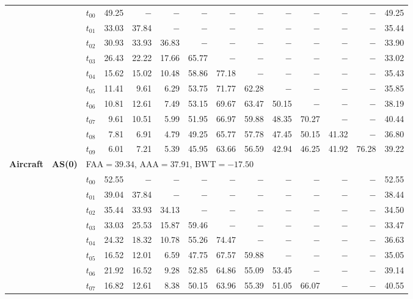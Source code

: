 \begin{table}[ht]
\begin{tabular}{@{}l l l *{11}{r}@{}}
 & & $t_{00}$ & 49.25 & $-$ & $-$ & $-$ & $-$ & $-$ & $-$ & $-$ & $-$ & $-$ & 49.25 \\
 & & $t_{01}$ & 33.03 & 37.84 & $-$ & $-$ & $-$ & $-$ & $-$ & $-$ & $-$ & $-$ & 35.44 \\
 & & $t_{02}$ & 30.93 & 33.93 & 36.83 & $-$ & $-$ & $-$ & $-$ & $-$ & $-$ & $-$ & 33.90 \\
 & & $t_{03}$ & 26.43 & 22.22 & 17.66 & 65.77 & $-$ & $-$ & $-$ & $-$ & $-$ & $-$ & 33.02 \\
 & & $t_{04}$ & 15.62 & 15.02 & 10.48 & 58.86 & 77.18 & $-$ & $-$ & $-$ & $-$ & $-$ & 35.43 \\
 & & $t_{05}$ & 11.41 & 9.61 & 6.29 & 53.75 & 71.77 & 62.28 & $-$ & $-$ & $-$ & $-$ & 35.85 \\
 & & $t_{06}$ & 10.81 & 12.61 & 7.49 & 53.15 & 69.67 & 63.47 & 50.15 & $-$ & $-$ & $-$ & 38.19 \\
 & & $t_{07}$ & 9.61 & 10.51 & 5.99 & 51.95 & 66.97 & 59.88 & 48.35 & 70.27 & $-$ & $-$ & 40.44 \\
 & & $t_{08}$ & 7.81 & 6.91 & 4.79 & 49.25 & 65.77 & 57.78 & 47.45 & 50.15 & 41.32 & $-$ & 36.80 \\
 & & $t_{09}$ & 6.01 & 7.21 & 5.39 & 45.95 & 63.66 & 56.59 & 42.94 & 46.25 & 41.92 & 76.28 & 39.22 \\
\midrule
\multirow{11}{*}{\textbf{Aircraft}} & \multirow{11}{*}{\textbf{AS(0)}} & \multicolumn{12}{l}{\quad\small FAA$=39.34$,\; AAA$=37.91$,\; BWT$=-17.50$} \\
 & & $t_{00}$ & 52.55 & $-$ & $-$ & $-$ & $-$ & $-$ & $-$ & $-$ & $-$ & $-$ & 52.55 \\
 & & $t_{01}$ & 39.04 & 37.84 & $-$ & $-$ & $-$ & $-$ & $-$ & $-$ & $-$ & $-$ & 38.44 \\
 & & $t_{02}$ & 35.44 & 33.93 & 34.13 & $-$ & $-$ & $-$ & $-$ & $-$ & $-$ & $-$ & 34.50 \\
 & & $t_{03}$ & 33.03 & 25.53 & 15.87 & 59.46 & $-$ & $-$ & $-$ & $-$ & $-$ & $-$ & 33.47 \\
 & & $t_{04}$ & 24.32 & 18.32 & 10.78 & 55.26 & 74.47 & $-$ & $-$ & $-$ & $-$ & $-$ & 36.63 \\
 & & $t_{05}$ & 16.52 & 12.01 & 6.59 & 47.75 & 67.57 & 59.88 & $-$ & $-$ & $-$ & $-$ & 35.05 \\
 & & $t_{06}$ & 21.92 & 16.52 & 9.28 & 52.85 & 64.86 & 55.09 & 53.45 & $-$ & $-$ & $-$ & 39.14 \\
 & & $t_{07}$ & 16.82 & 12.61 & 8.38 & 50.15 & 63.96 & 55.39 & 51.05 & 66.07 & $-$ & $-$ & 40.55 \\

\end{tabular}
\end{table}

